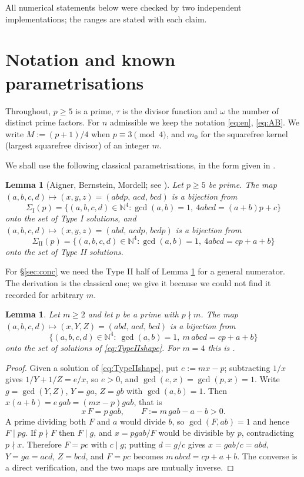 \documentclass[11pt,reqno]{amsart}
\theoremstyle{plain}
\newtheorem{lemma}[theorem]{Lemma}
\theoremstyle{definition}
\numberwithin{equation}{section}
\newcommand{\N}{\mathbb{N}}
\begin{document}
All numerical statements below were checked by two independent implementations; the
ranges are stated with each claim.

\section{Notation and known parametrisations}\label{sec:known}

Throughout, $p\ge5$ is a prime, $\tau$ is the divisor function and $\omega$ the number
of distinct prime factors. For $n$ admissible we keep the notation \eqref{eq:en},
\eqref{eq:AB}. We write $M:=(p+1)/4$ when $p\equiv3\pmod4$, and $m_{0}$ for the squarefree kernel
(largest squarefree divisor) of an integer $m$.

We shall use the following classical parametrisations, in the form given in
\cite[\S2]{ElsholtzTao}.

\begin{lemma}[Aigner, Bernstein, Mordell; see {\cite[Prop.~2.2, 2.6]{ElsholtzTao}}]
\label{lem:param}
Let $p\ge5$ be prime. The map $(a,b,c,d)\mapsto(x,y,z)=(abdp,\,acd,\,bcd)$ is a
bijection from
\[
  \Sigma_{\mathrm{I}}(p)=\{(a,b,c,d)\in\N^{4}:\gcd(a,b)=1,\ 4abcd=(a+b)p+c\}
\]
onto the set of Type I solutions, and $(a,b,c,d)\mapsto(x,y,z)=(abd,\,acdp,\,bcdp)$
is a bijection from
\[
  \Sigma_{\mathrm{II}}(p)=\{(a,b,c,d)\in\N^{4}:\gcd(a,b)=1,\ 4abcd=cp+a+b\}
\]
onto the set of Type II solutions.
\end{lemma}

For \S\ref{sec:conc} we need the Type II half of Lemma \ref{lem:param} for a general
numerator. The derivation is the classical one; we give it because we could not find it
recorded for arbitrary $m$.

\begin{lemma}\label{lem:paramm}
Let $m\ge2$ and let $p$ be a prime with $p\nmid m$. The map
$(a,b,c,d)\mapsto(x,Y,Z)=(abd,\,acd,\,bcd)$ is a bijection from
\[
  \{(a,b,c,d)\in\N^{4}:\ \gcd(a,b)=1,\ m\,abcd=cp+a+b\}
\]
onto the set of solutions of \eqref{eq:TypeIIshape}. For $m=4$ this is
\cite[Prop.~2.6]{ElsholtzTao}.
\end{lemma}

\begin{proof}
Given a solution of \eqref{eq:TypeIIshape}, put $e:=mx-p$; subtracting $1/x$ gives
$1/Y+1/Z=e/x$, so $e>0$, and $\gcd(e,x)=\gcd(p,x)=1$. Write $g=\gcd(Y,Z)$, $Y=ga$,
$Z=gb$ with $\gcd(a,b)=1$. Then $x(a+b)=e\,gab=(mx-p)gab$, that is
\[
  x\,F=p\,gab,\qquad F:=m\,gab-a-b>0 .
\]
A prime dividing both $F$ and $a$ would divide $b$, so $\gcd(F,ab)=1$ and hence
$F\mid pg$. If $p\nmid F$ then $F\mid g$, and $x=pgab/F$ would be divisible by $p$,
contradicting $p\nmid x$. Therefore $F=pc$ with $c\mid g$; putting $d=g/c$ gives
$x=gab/c=abd$, $Y=ga=acd$, $Z=bcd$, and $F=pc$ becomes $m\,abcd=cp+a+b$. The converse
is a direct verification, and the two maps are mutually inverse.
\end{proof}
\end{document}
